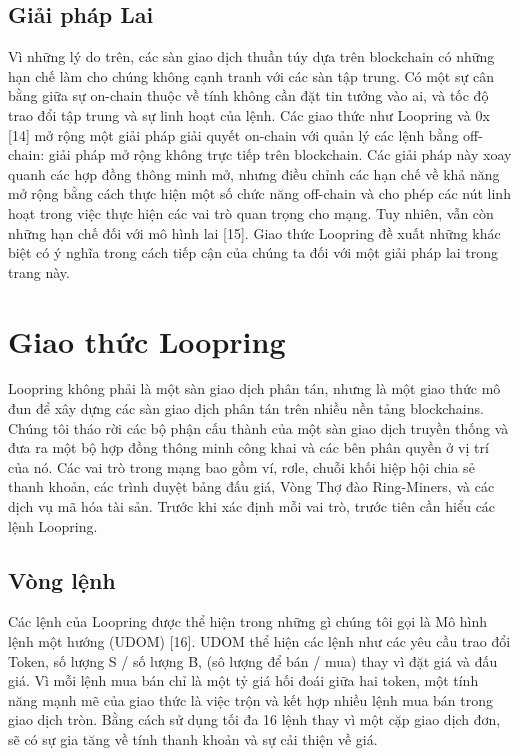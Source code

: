 \documentclass[12pt,a4paper]{article}
\begin{document}
\begin{multicols}{2}
\subsection{Giải pháp Lai}
Vì những lý do trên, các sàn giao dịch thuần túy dựa trên blockchain có những hạn chế làm cho chúng không cạnh tranh với các sàn tập trung. Có một sự cân bằng giữa sự on-chain thuộc về tính không cần đặt tin tưởng vào ai, và tốc độ trao đổi tập trung và sự linh hoạt của lệnh. Các giao thức như Loopring và 0x [14] mở rộng một giải pháp giải quyết on-chain với quản lý các lệnh bằng off-chain: giải pháp mở rộng không trực tiếp trên blockchain. Các giải pháp này xoay quanh các hợp đồng thông minh mở, nhưng điều chỉnh các hạn chế về khả năng mở rộng bằng cách thực hiện một số chức năng off-chain và cho phép các nút linh hoạt trong việc thực hiện các vai trò quan trọng cho mạng. Tuy nhiên, vẫn còn những hạn chế đối với mô hình lai [15]. Giao thức Loopring đề xuất những khác biệt có ý nghĩa trong cách tiếp cận của chúng ta đối với một giải pháp lai trong trang này.

\section{Giao thức Loopring \label{sec:loopring_protocol}}
Loopring không phải là một sàn giao dịch phân tán, nhưng là một giao thức mô đun để xây dựng các sàn giao dịch phân tán trên nhiều nền tảng blockchains. Chúng tôi tháo rời các bộ phận cấu thành của một sàn giao dịch truyền thống và đưa ra một bộ hợp đồng thông minh công khai và các bên phân quyền ở vị trí của nó. Các vai trò trong mạng bao gồm ví, rơle, chuỗi khối hiệp hội chia sẻ thanh khoản, các trình duyệt bảng đấu giá, Vòng Thợ đào Ring-Miners, và các dịch vụ mã hóa tài sản. Trước khi xác định mỗi vai trò, trước tiên cần hiểu các lệnh Loopring.

\subsection{Vòng lệnh\label{sec:order_ring}}
Các lệnh của Loopring được thể hiện trong những gì chúng tôi gọi là Mô hình lệnh một hướng (UDOM) [16]. UDOM thể hiện các lệnh như các yêu cầu trao đổi Token, số lượng S / số lượng B, (sô lượng để bán / mua) thay vì đặt giá và đấu giá. Vì mỗi lệnh mua bán chỉ là một tỷ giá hối đoái giữa hai token, một tính năng mạnh mẽ của giao thức là việc trộn và kết hợp nhiều lệnh mua bán trong giao dịch tròn. Bằng cách sử dụng tối đa 16 lệnh thay vì một cặp giao dịch đơn, sẽ có sự gia tăng về tính thanh khoản và sự cải thiện về giá.


\end{multicols}
\end{document}
